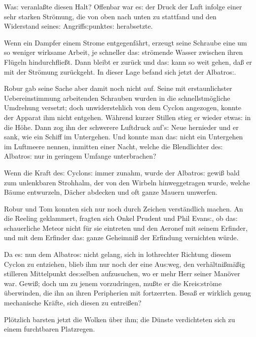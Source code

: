 \documentclass[oneside,12pt]{book}
\newcommand{\s}{s:}
\begin{document}
Wa{\s} veranla{\ss}te diesen Halt? Offenbar war e{\s} der Druck der
Luft infolge einer sehr starken Str\"omung, die von oben nach unten
zu stattfand und den Widerstand seine{\s} Angriff{\s}punkte{\s}
herabsetzte.

Wenn ein Dampfer einem Strome entgegenf\"ahrt, erzeugt seine Schraube
eine um so weniger wirksame Arbeit, je schneller da{\s} str\"omende
Wasser zwischen ihren Fl\"ugeln hindurchflie{\ss}t. Dann bleibt er
zur\"uck und da{\s} kann so weit gehen, da{\ss} er mit der Str\"omung
zur\"uckgeht. In dieser Lage befand sich jetzt der
{\glqq}Albatro{\s}{\grqq}.

Robur gab seine Sache aber damit noch nicht auf. Seine mit
erstaunlichster Uebereinstimmung arbeitenden Schrauben wurden in die
schnellstm\"ogliche Umdrehung versetzt; doch unwiderstehlich von dem
Cyclon angezogen, konnte der Apparat ihm nicht entgehen. W\"ahrend
kurzer Stillen stieg er wieder etwa{\s} in die H\"ohe. Dann zog ihn
der schwerere Luftdruck auf'{\s} Neue hernieder und er sank, wie ein
Schiff im Untergehen. Und konnte man da{\s} nicht ein Untergehen im
Luftmeere nennen, inmitten einer Nacht, welche die Blendlichter
de{\s} {\glqq}Albatro{\s}{\grqq} nur in geringem Umfange
unterbrachen?

Wenn die Kraft de{\s} Cyclon{\s} immer zunahm, wurde der
{\glqq}Albatro{\s}{\grqq} gewi{\ss} bald zum unlenkbaren Strohhalm,
der von den Wirbeln hinweggetragen wurde, welche B\"aume entwurzeln,
D\"acher abdecken und oft ganze Mauern umwerfen.

Robur und Tom konnten sich nur noch durch Zeichen verst\"andlich
machen. An die Reeling geklammert, fragten sich Onkel Prudent und
Phil Evan{\s}, ob da{\s} schauerliche Meteor nicht f\"ur sie
eintreten und den Aeronef mit seinem Erfinder, und mit dem Erfinder
da{\s} ganze Geheimni{\ss} der Erfindung vernichten w\"urde.

Da e{\s} nun dem {\glqq}Albatro{\s}{\grqq} nicht gelang, sich in
lothrechter Richtung diesem Cyclon zu ent\/ziehen, blieb ihm nur noch
der eine Au{\s}weg, den verh\"altni{\ss}m\"a{\ss}ig stilleren
Mittelpunkt de{\s}selben aufzusuchen, wo er mehr Herr seiner
Man\"over war. Gewi{\ss}; doch um zu jenem vorzudringen, mu{\ss}te er
die Krei{\s}str\"ome \"uberwinden, die ihn an ihren Peripherien mit
fort\/zerrten. Besa{\ss} er wirklich genug mechanische Kr\"afte, sich
diesen zu entrei{\ss}en?

Pl\"otzlich barsten jetzt die Wolken \"uber ihm; die D\"unste
verdichteten sich zu einem furchtbaren Platzregen.
\end{document}
